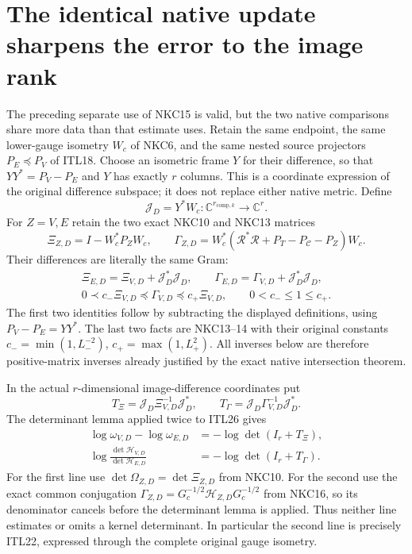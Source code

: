 \documentclass[11pt,a4paper]{article}
\begin{document}
\section{The identical native update sharpens the error to the image rank}

The preceding separate use of NKC15 is valid, but the two native
comparisons share more data than that estimate uses. Retain the
same endpoint, the same lower-gauge isometry $W_c$ of NKC6,
and the same nested source projectors $P_E\preceq P_V$ of ITL18.
Choose an isometric frame $Y$ for their difference, so that
$YY^*=P_V-P_E$ and $Y$ has exactly $r$ columns. This is a
coordinate expression of the original difference subspace;
it does not replace either native metric. Define
\[
 \mathcal J_D=Y^*W_c:\mathbb C^{r_{\mathrm{comp},k}}
                         \longrightarrow\mathbb C^r .
\]
For $Z=V,E$ retain the two exact NKC10 and NKC13 matrices
\[
 \Xi_{Z,D}=I-W_c^*P_ZW_c,\qquad
 \Gamma_{Z,D}=W_c^*
    (\mathcal R^*\mathcal R+P_T-P_{\mathcal C}-P_Z)W_c.
\]
Their differences are literally the same Gram:
\[
 \begin{gathered}
 \Xi_{E,D}=\Xi_{V,D}+\mathcal J_D^*\mathcal J_D,\qquad
 \Gamma_{E,D}=\Gamma_{V,D}+\mathcal J_D^*\mathcal J_D,\\
 0\prec c_-\Xi_{V,D}\preceq\Gamma_{V,D}
                         \preceq c_+\Xi_{V,D},\qquad
 0<c_-\le1\le c_+.
 \end{gathered}                                      \tag{ITL26}
\]
The first two identities follow by subtracting the displayed
definitions, using $P_V-P_E=YY^*$. The last two facts are
NKC13--14 with their original constants
$c_-=\min(1,L_-^{-2})$, $c_+=\max(1,L_+^2)$.
All inverses below are therefore positive-matrix inverses
already justified by the exact native intersection theorem.

In the actual $r$-dimensional image-difference coordinates put
\[
 T_\Xi=\mathcal J_D\Xi_{V,D}^{-1}\mathcal J_D^*,\qquad
 T_\Gamma=\mathcal J_D\Gamma_{V,D}^{-1}\mathcal J_D^*.
\]
The determinant lemma applied twice to ITL26 gives
\[
 \begin{split}
 \log\omega_{V,D}-\log\omega_{E,D}
     &=-\log\det(I_r+T_\Xi),\\
 \log\frac{\det\mathcal H_{V,D}}{\det\mathcal H_{E,D}}
     &=-\log\det(I_r+T_\Gamma).
 \end{split}                                        \tag{ITL27}
\]
For the first line use $\det\Omega_{Z,D}=\det\Xi_{Z,D}$
from NKC10. For the second use the exact common conjugation
$\Gamma_{Z,D}=G_c^{-1/2}\mathcal H_{Z,D}G_c^{-1/2}$
from NKC16, so its denominator cancels before the determinant
lemma is applied. Thus neither line estimates or omits a
kernel determinant. In particular the second line is precisely
ITL22, expressed through the complete original gauge isometry.
\end{document}
